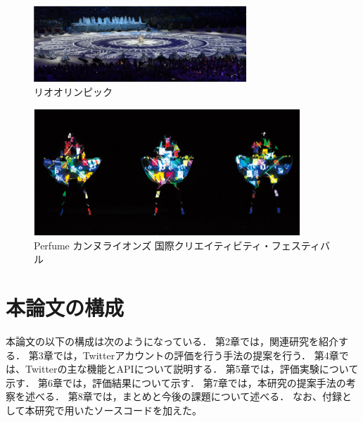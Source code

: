 \begin{figure}[b]
    \centering
    \includegraphics[width=8cm]{image/rio.png}
    \caption{リオオリンピック}
  \label{rio}
\end{figure}

\clearpage

\begin{figure}[t]
    \centering
    \includegraphics[width=10cm]{image/perfume.png}
    \caption{Perfume カンヌライオンズ 
    \protect\linebreak 国際クリエイティビティ・フェスティバル\cite{hoge}}
  \label{perfume}
\end{figure}

  



\clearpage
\section{本論文の構成}
本論文の以下の構成は次のようになっている．
第2章では，関連研究を紹介する．
第3章では，Twitterアカウントの評価を行う手法の提案を行う．
第4章では、Twitterの主な機能とAPIについて説明する．
第5章では，評価実験について示す．
第6章では，評価結果について示す．
第7章では，本研究の提案手法の考察を述べる．
第8章では，まとめと今後の課題について述べる．
なお、付録として本研究で用いたソースコードを加えた。
